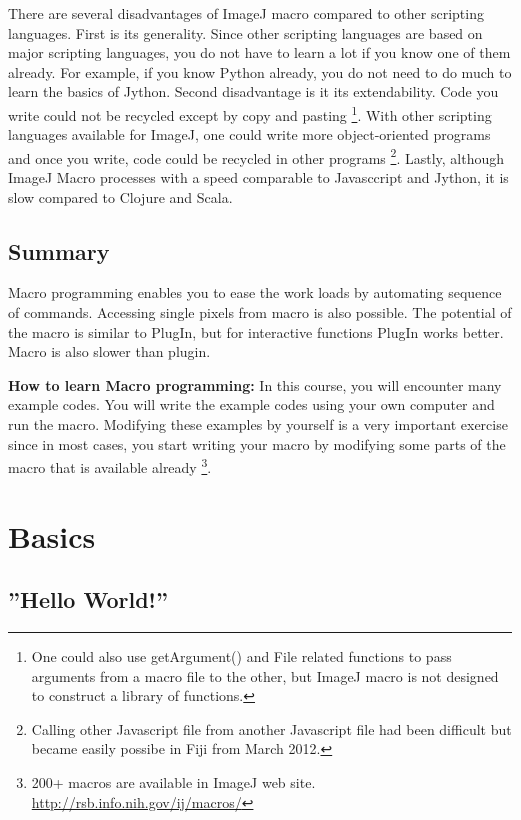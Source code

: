 \documentclass[11pt,a4paper,oneside]{report}
\begin{document}
There are several disadvantages of ImageJ macro compared to other
scripting languages. First is its generality. Since other scripting
languages are based on major scripting languages, you do not have
to learn a lot if you know one of them already. For example, if you know
Python already, you do not need to do much to learn the basics of Jython. Second
disadvantage is it its extendability.
Code you write could not be recycled except by copy and pasting
\footnote{One could also use getArgument() and File related functions to pass
arguments from a macro file to the other, but ImageJ macro is not designed to
construct a library of functions.}.
With other scripting languages available for ImageJ, one could write more object-oriented programs 
and once you write, code could be recycled in other programs
\footnote{ Calling other Javascript file from another Javascript file had been
difficult but became easily possibe in Fiji from March 2012.}.
Lastly, although ImageJ Macro processes with a speed comparable to
Javasccript and Jython, it is slow compared to Clojure and Scala. 

\subsection{Summary}
Macro programming enables you to ease the work loads by automating sequence of commands. 
Accessing single pixels from macro is also possible. 
The potential of the macro is similar to PlugIn, but for interactive functions PlugIn works better. 
Macro is also slower than plugin. 

\textbf{How to learn Macro programming:} 
In this course, you will encounter many example codes. 
You will write the example codes using your own computer and run the macro. 
Modifying these examples by yourself is a very important exercise since in most
cases, you start writing your macro by modifying some parts of the macro that is
available already \footnote{200+ macros are available in ImageJ web site. 
\href{http://rsb.info.nih.gov/ij/macros/}{http://rsb.info.nih.gov/ij/macros/}}.
 
\newpage
\section{Basics}

\subsection{''Hello World!''}
\end{document}
